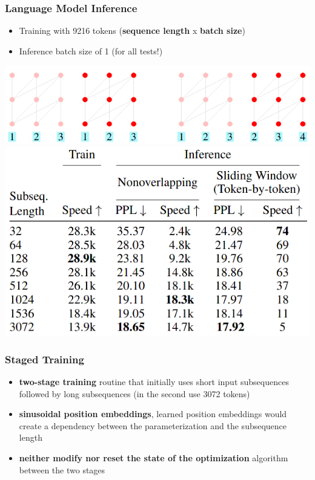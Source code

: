 \documentclass{beamer}
\begin{document}
\begin{frame}
    \frametitle{Language Model Inference}
    \begin{itemize}
        \item Training with 9216 tokens (\textbf{sequence length} x \textbf{batch size})
        \item Inference batch size of 1 (for all tests!)
    \end{itemize}
    \begin{center}
        \includegraphics[scale=0.25]{img/shortformer_window.png}
        \includegraphics[scale=0.30]{img/shortformer_window_performance.png}
    \end{center}
\end{frame}

\begin{frame}
    \frametitle{Staged Training}
    \begin{itemize}
        \item \textbf{two-stage training} routine that initially uses short input subsequences followed by long subsequences (in the second use 3072 tokens)
        \item \textbf{sinusoidal position embeddings}, learned position embeddings would create a dependency between the parameterization and the subsequence length
        \item \textbf{neither modify nor reset the state of the optimization} algorithm between the two stages
    \end{itemize}
\end{frame}
\end{document}
